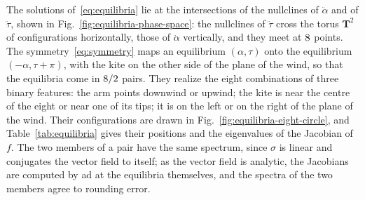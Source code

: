 The solutions of~\eqref{eq:equilibria} lie at the intersections of the nullclines of \(\ddot\alpha\) and of \(\ddot\tau\), shown in Fig.~\ref{fig:equilibria-phase-space}: the nullclines of \(\ddot\tau\) cross the torus \(\mathbf{T}^2\) of configurations horizontally, those of \(\ddot\alpha\) vertically, and they meet at \(8\) points.
The symmetry~\eqref{eq:symmetry} maps an equilibrium \((\alpha, \tau)\) onto the equilibrium \((-\alpha, \tau + \pi)\), with the kite on the other side of the plane of the wind, so that the equilibria come in \(8/2\) pairs.
They realize the eight combinations of three binary features: the arm points downwind or upwind; the kite is near the centre of the eight or near one of its tips; it is on the left or on the right of the plane of the wind.
Their configurations are drawn in Fig.~\ref{fig:equilibria-eight-circle}, and Table~\ref{tab:equilibria} gives their positions and the eigenvalues of the Jacobian of \(f\).
The two members of a pair have the same spectrum, since \(\sigma\) is linear and conjugates the vector field to itself; as the vector field is analytic, the Jacobians are computed by \ac{ad} at the equilibria themselves, and the spectra of the two members agree to rounding error.


